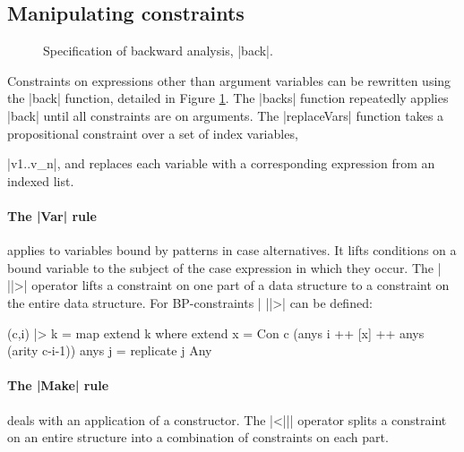 \subsection{Manipulating constraints}
\label{sec:backward}

\begin{figure}
\caption{Specification of backward analysis, |back|.}
\label{fig:backward}
\figureend
\end{figure}

Constraints on expressions other than argument variables can be rewritten using the |back| function, detailed in Figure \ref{fig:backward}. The |backs| function repeatedly applies |back| until all constraints are on arguments. The |replaceVars| function takes a propositional constraint over a set of index variables, \ignore|v1..v_n|, and replaces each variable with a corresponding expression from an indexed list.

\paragraph{The |Var| rule} applies to variables bound by patterns in case alternatives. It lifts conditions on a bound variable to the subject of the case expression in which they occur. The | ||>| operator lifts a constraint on one part of a data structure to a constraint on the entire data structure. For BP-constraints | ||>| can be defined:

\begin{code}
(c,i) |> k = map extend k
    where
    extend x = Con c (anys i ++ [x] ++ anys (arity c-i-1))
    anys j = replicate j Any
\end{code}

\paragraph{The |Make| rule} deals with an application of a constructor. The |<||| operator splits a constraint on an entire structure into a combination of constraints on each part.

